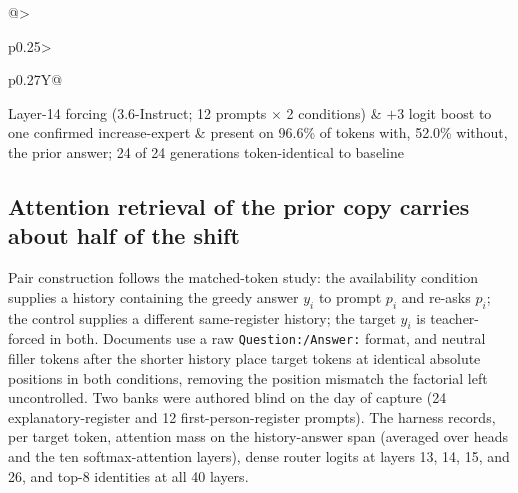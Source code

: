 \documentclass[10pt,a4paper,twocolumn]{article}
\begin{document}
\begin{table}[!t]
\begin{tabularx}{\textwidth}{@{}>{\raggedright\arraybackslash}p{}>{\raggedright\arraybackslash}p{}Y@{}}
Layer-14 forcing (3.6-Instruct; 12 prompts \(\times\) 2 conditions)
& \(+3\) logit boost to one confirmed increase-expert
& present on 96.6\% of tokens with, 52.0\% without, the prior answer; 24 of
24 generations token-identical to baseline \\
\bottomrule
\end{tabularx}
\caption{\textbf{Mechanism, replication, and intervention summary.} 3.5-Base is
Qwen3.5-35B-A3B-Base; 3.6-Instruct is instruction-tuned Qwen3.6-35B-A3B.
Bootstrap CIs use 10,000 prompt-cluster resamples (seed 299792). Selection
frequency is the share of scored tokens at which the expert is among the eight
selected; Jaccard is the intersection over union of two top-8 sets; copy
fraction is defined in Section~\ref{sec:methods}.}
\label{tab:mech}
\end{table}

\subsection{Attention retrieval of the prior copy carries about half of the shift}

Pair construction follows the matched-token study: the availability condition
supplies a history containing the greedy answer \(y_i\) to prompt \(p_i\) and
re-asks \(p_i\); the control supplies a different same-register history; the
target \(y_i\) is teacher-forced in both. Documents use a raw
\texttt{Question:/Answer:} format, and neutral filler tokens after the shorter
history place target tokens at identical absolute positions in both
conditions, removing the position mismatch the factorial left uncontrolled.
Two banks were authored blind on the day of capture (24 explanatory-register
and 12 first-person-register prompts). The harness records, per target token,
attention mass on the history-answer span (averaged over heads and the ten
softmax-attention layers), dense router logits at layers 13, 14, 15, and 26,
and top-8 identities at all 40 layers.
\end{document}
